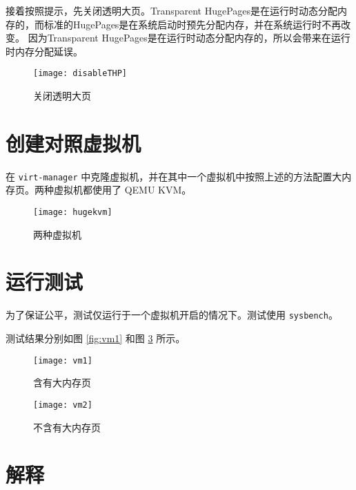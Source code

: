     接着按照提示，先关闭透明大页。Transparent HugePages是在运行时动态分配内存的，而标准的HugePages是在系统启动时预先分配内存，并在系统运行时不再改变。
    因为Transparent HugePages是在运行时动态分配内存的，所以会带来在运行时内存分配延误。\cite{THP}


    \begin{figure}[H]
        \centering
        \texttt{[image: disableTHP]}
        \caption{关闭透明大页}\label{fig:disableTHP}
    \end{figure}

    \section{创建对照虚拟机}

    在 \verb"virt-manager" 中克隆虚拟机，并在其中一个虚拟机中按照上述的方法配置大内存页。两种虚拟机都使用了 QEMU KVM。

    \begin{figure}[H]
        \centering
        \texttt{[image: hugekvm]}
        \caption{两种虚拟机}\label{fig:hugekvm}
    \end{figure}

    \section{运行测试}

    为了保证公平，测试仅运行于一个虚拟机开启的情况下。测试使用 \verb"sysbench"。
    
    
    测试结果分别如图 \ref{fig:vm1} 和图 \ref{fig:vm2} 所示。

    \begin{figure}[H]
        \centering
        \begin{minipage}{0.48\textwidth}
            \centering
            \texttt{[image: vm1]}
            \caption{含有大内存页}\label{fig:vm1}
        \end{minipage}
        \begin{minipage}{0.48\textwidth}
            \centering
            \texttt{[image: vm2]}
            \caption{不含有大内存页}\label{fig:vm2}
        \end{minipage}
    \end{figure}

    \section{解释}

